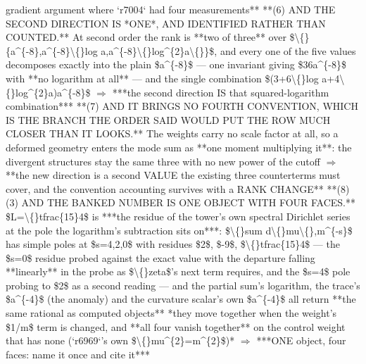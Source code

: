 \begin{description}
gradient argument where `r7004` had four measurements**  **(6)  AND THE SECOND DIRECTION IS *ONE*, AND IDENTIFIED RATHER THAN COUNTED.** At second order the rank is **two of three** over \$\textbackslash\{\}\{a\textasciicircum{}\{-8\},a\textasciicircum{}\{-8\}\textbackslash\{\}log a,a\textasciicircum{}\{-8\}\textbackslash\{\}log\textasciicircum{}\{2\}a\textbackslash\{\}\}\$, and every one of the five values decomposes exactly into the plain \$a\textasciicircum{}\{-8\}\$ --- one invariant giving \$36a\textasciicircum{}\{-8\}\$ with **no logarithm at all** --- and the single combination \$(3+6\textbackslash\{\}log a+4\textbackslash\{\}log\textasciicircum{}\{2\}a)a\textasciicircum{}\{-8\}\$ \ensuremath{\Rightarrow} ***the second direction IS that squared-logarithm combination***  **(7)  AND IT BRINGS NO FOURTH CONVENTION, WHICH IS THE BRANCH THE ORDER SAID WOULD PUT THE ROW MUCH CLOSER THAN IT LOOKS.** The weights carry no scale factor at all, so a deformed geometry enters the mode sum as **one moment multiplying it**: the divergent structures stay the same three with no new power of the cutoff \ensuremath{\Rightarrow} **the new direction is a second VALUE the existing three counterterms must cover, and the convention accounting survives with a RANK CHANGE**  **(8)  (3) AND THE BANKED NUMBER IS ONE OBJECT WITH FOUR FACES.** \$L=\textbackslash\{\}tfrac\{15\}4\$ is ***the residue of the tower's own spectral Dirichlet series at the pole the logarithm's subtraction sits on***: \$\textbackslash\{\}sum d\textbackslash\{\}mu\textbackslash\{\},m\textasciicircum{}\{-s\}\$ has simple poles at \$s=4,2,0\$ with residues \$2\$, \$-9\$, \$\textbackslash\{\}tfrac\{15\}4\$ --- the \$s=0\$ residue probed against the exact value with the departure falling **linearly** in the probe as \$\textbackslash\{\}zeta\$'s next term requires, and the \$s=4\$ pole probing to \$2\$ as a second reading --- and the partial sum's logarithm, the trace's \$a\textasciicircum{}\{-4\}\$ (the anomaly) and the curvature scalar's own \$a\textasciicircum{}\{-4\}\$ all return **the same rational as computed objects**  *they move together when the weight's \$1/m\$ term is changed, and **all four vanish together** on the control weight that has none (`r6969`'s own \$\textbackslash\{\}mu\textasciicircum{}\{2\}=m\textasciicircum{}\{2\}\$)* \ensuremath{\Rightarrow} ***ONE object, four faces: name it once and cite it***

\end{description}
